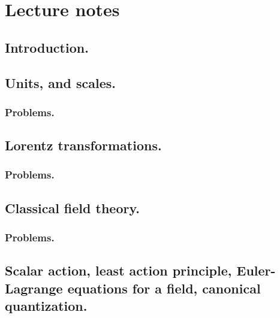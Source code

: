 %
%
\part{Lecture notes}
   \chapter{Introduction.}
      
   \chapter{Units, and scales.}
      
      \section{Problems.}
         
   \chapter{Lorentz transformations.}
      
      
      \section{Problems.}
         
   \chapter{Classical field theory.}
      
      \section{Problems.}
         
         
         
   \chapter{Scalar action, least action principle, Euler-Lagrange equations for a field, canonical quantization.}
      
